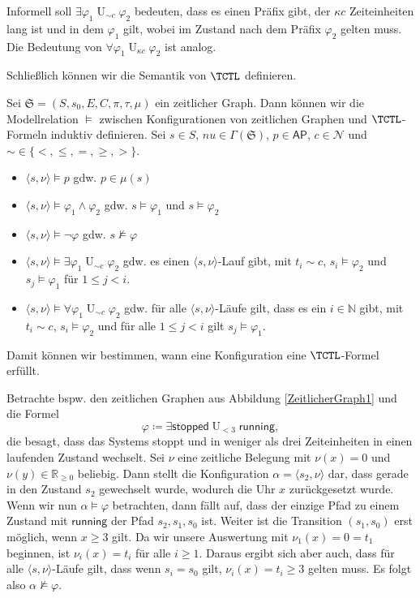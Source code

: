 Informell soll $\exists\varphi_1 \operatorname{U}_{\sim c}\varphi_2$ bedeuten, dass es einen Präfix gibt, der $\kappa c$ Zeiteinheiten lang ist und in dem $\varphi_1$ gilt, wobei im Zustand nach dem Präfix $\varphi_2$ gelten muss.
Die Bedeutung von $\forall\varphi_1 \operatorname{U}_{\kappa c}\varphi_2$ ist analog.

Schließlich können wir die Semantik von $\TCTL$ definieren.
\begin{definition}
	Sei $\mathfrak{S}=(S,s_0,E,C,\pi,\tau,\mu)$ ein zeitlicher Graph.
	Dann können wir die Modellrelation $\models$ zwischen Konfigurationen von zeitlichen Graphen und $\TCTL$-Formeln induktiv definieren. Sei $s\in S$, $nu\in \Gamma(\mathfrak{S})$, $p\in \mathsf{AP}$, $c\in \mathcal{N}$ und $\sim\in \{<,\leq,=,\geq,>\}$. \cite{alur1990model}
	\begin{itemize}
		\item $\langle s,\nu\rangle \models p$ gdw. $p\in \mu(s)$
		\item $\langle s,\nu\rangle \models \varphi_1\land \varphi_2$ gdw. $s\models \varphi_1$ und $s\models \varphi_2$
		\item $\langle s,\nu \rangle \models \neg\varphi$ gdw. $s\not\models\varphi$
		\item $\langle s,\nu \rangle \models \exists\varphi_1 \operatorname{U}_{\sim c}\varphi_2$ gdw. es einen $\langle s,\nu\rangle$-Lauf gibt, mit $t_i \sim c$, $s_i\models \varphi_2$ und $s_j\models \varphi_1$ für $1\leq j < i$.
		\item $\langle s,\nu \rangle\models \forall\varphi_1 \operatorname{U}_{\sim c}\varphi_2$ gdw. für alle $\langle s,\nu\rangle$-Läufe gilt, dass es ein $i\in \mathbb{N}$ gibt, mit $t_i \sim c$, $s_i\models \varphi_2$ und für alle $1\leq j < i$ gilt $s_j\models \varphi_1$.
	\end{itemize}
\end{definition}

Damit können wir bestimmen, wann eine Konfiguration eine $\TCTL$-Formel erfüllt.
\begin{example}
	Betrachte bspw. den zeitlichen Graphen aus Abbildung \ref{ZeitlicherGraph1} und die Formel 
	$$\varphi\coloneqq \exists\mathsf{stopped}\operatorname{U}_{< 3} \mathsf{running},$$ die besagt, dass das Systems stoppt und in weniger als drei Zeiteinheiten in einen laufenden Zustand wechselt.
	Sei $\nu$ eine zeitliche Belegung mit $\nu(x)=0$ und $\nu(y)\in \mathbb{R}_{\geq 0}$ beliebig.
	Dann stellt die Konfiguration $\alpha = \langle s_2,\nu \rangle$ dar, dass gerade in den Zustand $s_2$ gewechselt wurde, wodurch die Uhr $x$ zurückgesetzt wurde.
	Wenn wir nun $\alpha \models \varphi$ betrachten, dann fällt auf, dass der einzige Pfad zu einem Zustand mit $\mathsf{running}$ der Pfad $s_2, s_1,s_0$ ist. 
	Weiter ist die Transition $(s_1,s_0)$ erst möglich, wenn $x\geq 3$ gilt.
	Da wir unsere Auswertung mit $\nu_1(x)=0=t_1$ beginnen, ist $\nu_i(x)=t_i$ für alle $i\geq 1$.
	Daraus ergibt sich aber auch, dass für alle $\langle s,\nu \rangle$-Läufe gilt, dass wenn $s_i = s_0$ gilt, $\nu_i(x)=t_i \geq 3$ gelten muss.
	Es folgt also $\alpha \not\models \varphi$.
\end{example}

